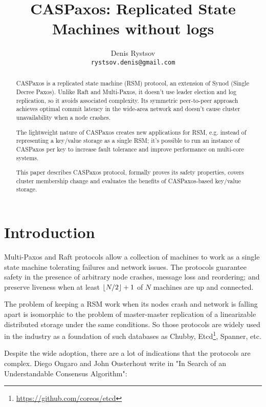 \documentclass[12pt]{article}
\theoremstyle{definition}
\DeclarePairedDelimiter{\floor}{\lfloor}{\rfloor}
\begin{document}
\title{CASPaxos: Replicated State Machines without logs}

\author{Denis Rystsov\\\texttt{rystsov.denis@gmail.com}}

\maketitle

\begin{abstract}
CASPaxos is a replicated state machine (RSM) protocol, an extension of Synod (Single Decree Paxos). Unlike Raft and Multi-Paxos, it doesn't use leader election and log replication, so it avoids associated complexity. Its symmetric peer-to-peer approach achieves optimal commit latency in the wide-area network and doesn't cause cluster unavailability when a node crashes.

The lightweight nature of CASPaxos creates new applications for RSM, e.g. instead of representing a key/value storage as a single RSM; it's possible to run an instance of CASPaxos per key to increase fault tolerance and improve performance on multi-core systems.

This paper describes CASPaxos protocol, formally proves its safety properties, covers cluster membership change and evaluates the benefits of CASPaxos-based key/value storage.
\end{abstract}

\section{Introduction}

Multi-Paxos\cite{lamport01} and Raft\cite{raft} protocols allow a collection of machines to work as a single state machine tolerating failures and network issues. The protocols guarantee safety in the presence of arbitrary node crashes, message loss and reordering; and preserve liveness when at least $\floor{N/2} + 1$ of $N$ machines are up and connected.

The problem of keeping a RSM work when its nodes crash and network is falling apart is isomorphic to the problem of master-master replication of a linearizable distributed storage under the same conditions. So those protocols are widely used in the industry as a foundation of such databases as Chubby\cite{chubby}, Etcd\footnote{\href{https://github.com/coreos/etcd}{https://github.com/coreos/etcd}}, Spanner\cite{spanner}, etc.

Despite the wide adoption, there are a lot of indications that the protocols are complex. Diego Ongaro and John Ousterhout write in "In Search of an Understandable Consensus Algorithm"\cite{raft}:
\end{document}
